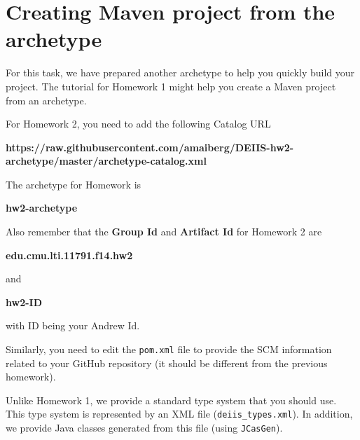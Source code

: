 
\section{Creating Maven project from the archetype}

For this task, we have prepared another archetype to help you quickly build your
project. The tutorial for Homework 1 might help you create a Maven project from
an archetype.

For Homework 2, you need to add the following Catalog URL

\begin{center}
\textbf{https://raw.githubusercontent.com/amaiberg/DEIIS-hw2-archetype/master/archetype-catalog.xml}
\end{center}

The archetype for Homework is

\begin{center}
\textbf{hw2-archetype}
\end{center}

Also remember that the \textbf{Group Id} and \textbf{Artifact Id} for Homework 2
are

\begin{center}
\textbf{edu.cmu.lti.11791.f14.hw2}
\end{center}

and

\begin{center}
\textbf{hw2-ID}
\end{center}

with ID being your Andrew Id.

Similarly, you need to edit the \texttt{pom.xml} file to provide the SCM
information related to your GitHub repository (it should be different
from the previous homework). 

Unlike Homework 1, we provide a standard type system that you should use.
This type system is represented by an XML file (\texttt{deiis\_types.xml}).
In addition, we provide Java classes generated from this
file (using \texttt{JCasGen}).
